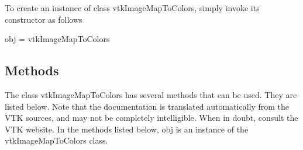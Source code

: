 To create an instance of class vtk\-Image\-Map\-To\-Colors, simply invoke its constructor as follows \begin{DoxyVerb}  obj = vtkImageMapToColors
\end{DoxyVerb}
 \hypertarget{vtkwidgets_vtkxyplotwidget_Methods}{}\subsection{Methods}\label{vtkwidgets_vtkxyplotwidget_Methods}
The class vtk\-Image\-Map\-To\-Colors has several methods that can be used. They are listed below. Note that the documentation is translated automatically from the V\-T\-K sources, and may not be completely intelligible. When in doubt, consult the V\-T\-K website. In the methods listed below, {\ttfamily obj} is an instance of the vtk\-Image\-Map\-To\-Colors class. 
